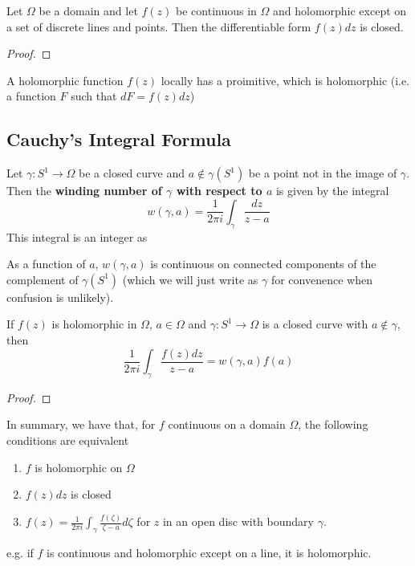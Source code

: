 \documentclass{article}
\begin{document}


\begin{theorem}
Let \(\Omega\) be a domain and let \(f(z)\) be continuous in \(\Omega\) and holomorphic except on a set of discrete lines and points. Then the differentiable form \(f(z)dz\) is closed.
\end{theorem}
\begin{proof}
\end{proof}

\begin{corollary}
A holomorphic function \(f(z)\) locally has a proimitive, which is holomorphic (i.e. a function \(F\) such that \(dF = f(z)dz\))
\end{corollary}

\subsection{Cauchy's Integral Formula}

\begin{definition}
Let \(\gamma: S^1 \to \Omega\) be a closed curve and \(a \notin \gamma(S^1)\) be a point not in the image of \(\gamma\). Then the \textbf{winding number of \(\gamma\) with respect to \(a\)} is given by the integral
\begin{equation}
  w(\gamma, a) = \frac{1}{2\pi i}\int_\gamma\frac{dz}{z - a}
\end{equation}
This integral is an integer as
\end{definition}
As a function of \(a\), \(w(\gamma, a)\) is continuous on connected components of the complement of \(\gamma(S^1)\) (which we will just write as \(\gamma\) for convenence when confusion is unlikely).

\begin{theorem}
If \(f(z)\) is holomorphic in \(\Omega\), \(a \in \Omega\) and \(\gamma: S^1 \to \Omega\) is a closed curve with \(a \notin \gamma\), then
\begin{equation}
  \frac{1}{2\pi i}\int_\gamma\frac{f(z)dz}{z - a} = w(\gamma, a)f(a)
\end{equation}
\end{theorem}
\begin{proof}
\end{proof}

In summary, we have that, for \(f\) continuous on a domain \(\Omega\), the following conditions are equivalent
\begin{enumerate}

  \item \(f\) is holomorphic on \(\Omega\)

  \item \(f(z)dz\) is closed

  \item \(f(z) = \frac{1}{2\pi i}\int_\gamma\frac{f(\zeta)}{\zeta - a}d\zeta\) for \(z\) in an open disc with boundary \(\gamma\).

\end{enumerate}
e.g. if \(f\) is continuous and holomorphic except on a line, it is holomorphic.
\end{document}
